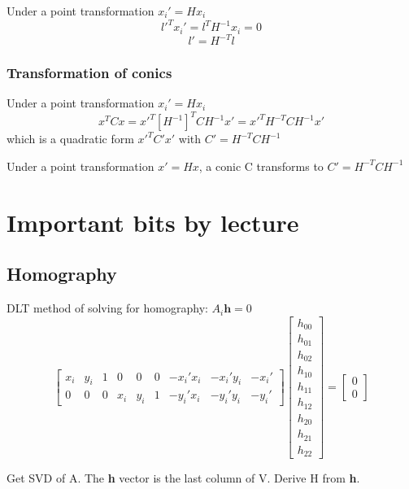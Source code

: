 Under a point transformation \( x_i' = H x_i \)
\[ l'^T x_i' = l^T H^{-1} x_i = 0 \]
\[ l' = H^{-T} l \]

\subsubsection{Transformation of conics}

Under a point transformation \( x_i' = H x_i \)
\[ x^T C x = x'^T {[H^{-1}]}^T C H^{-1} x' 
    = x'^T H^{-T} C H^{-1} x'
\]
which is a quadratic form \( x'^T C' x' \) with \(C' = H^{-T} C H^{-1} \)

Under a point transformation \( x' = H x \), a conic C transforms to \( C' =
H^{-T} C H^{-1} \)

\section{Important bits by lecture}

\subsection{Homography}

DLT method of solving for homography: \(A_i \boldsymbol{h} = 0\)
\[
    \begin{bmatrix}
        x_i & y_i & 1 & 0 & 0 & 0 & -x_i' x_i & -x_i' y_i & -x_i' \\
        0 & 0 & 0 & x_i & y_i & 1 & -y_i' x_i & -y_i' y_i & -y_i'
    \end{bmatrix}
    \begin{bmatrix}
        h_{00} \\
        h_{01} \\
        h_{02} \\

        h_{10} \\
        h_{11} \\
        h_{12} \\

        h_{20} \\
        h_{21} \\
        h_{22}
    \end{bmatrix}
    =
    \begin{bmatrix}
        0 \\
        0
    \end{bmatrix}
\]

Get SVD of A. The \textbf{h} vector is the last column of V. Derive H from
\textbf{h}.

